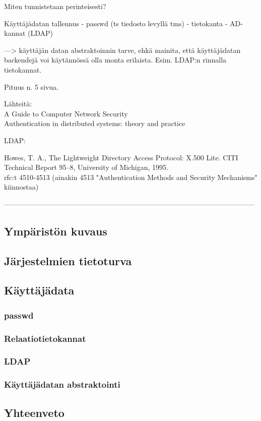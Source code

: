 Miten tunnistetaan perinteisesti?

Käyttäjädatan tallennus
- passwd (ts tiedosto levyllä tms)
- tietokanta
- AD-kannat (LDAP)

---> käyttäjän datan abstraktoinnin tarve, ehkä mainita, että käyttäjädatan backendejä voi käytännössä olla monta erilaista. Esim. LDAP:n rinnalla tietokannat.

Pituus n. 5 sivua.

Lähteitä:\\
A Guide to Computer Network Security \cite{authentication}\\
Authentication in distributed systems: theory and practice \cite{lampson}

LDAP:

Howes, T. A., The Lightweight Directory Access Protocol: X.500 Lite. CITI
Technical Report 95–8, University of Michigan, 1995. \cite{howes} \\
rfc:t 4510-4513 (ainakin 4513 "Authentication Methods and Security Mechanisms" kiinnostaa)

-----------------------------------------------------------------------------------------------------------


\subsection{Ympäristön kuvaus}

\subsection{Järjestelmien tietoturva}

\subsection{Käyttäjädata}

\subsubsection{passwd}

\subsubsection{Relaatiotietokannat}

\subsubsection{LDAP}

\subsubsection{Käyttäjädatan abstraktointi}

\subsection{Yhteenveto}

